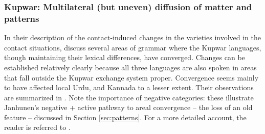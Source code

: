 \documentclass[output=paper]{langscibook}
\begin{document}
\subsubsection{Kupwar: Multilateral (but uneven) diffusion of matter and patterns} \label{Kupwar patterns}
In their description of the contact-induced changes in the varieties involved in the contact situations, \textcite{gumperzetal1971convergence} discuss several areas of grammar where the Kupwar languages, though maintaining their lexical differences, have converged. Changes can be established relatively clearly because all three languages are also spoken in areas that fall outside the Kupwar exchange system proper. Convergence seems mainly to have affected local Urdu, and Kannada to a lesser extent. Their observations are summarized in . Note the importance of negative categories: these illustrate Janhunen's \parencite*{janhunen2005} negative + active pathway to areal convergence -- the loss of an old feature -- discussed in Section \ref{sec:patterns}. For a more detailed account, the reader is referred to \textcite{gumperzetal1971convergence}.
\end{document}

